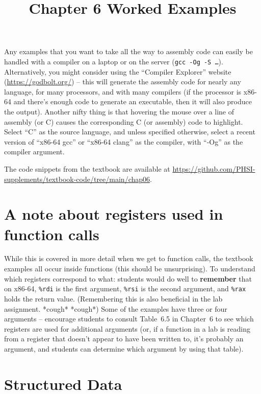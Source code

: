 \documentclass{article}
\begin{document}
\title{Chapter 6 Worked Examples}
\date{}
\maketitle

Any examples that you want to take all the way to assembly code can easily be handled with a compiler on a laptop or on the server (\texttt{gcc -Og -S \dots}).
Alternatively, you might consider using the ``Compiler Explorer'' website (\href{https://godbolt.org/}{https://godbolt.org/}) -- this will generate the assembly code for nearly any language, for many processors, and with many compilers (if the processor is x86-64 and there's enough code to generate an executable, then it will also produce the output).
Another nifty thing is that hovering the mouse over a line of assembly (or C) causes the corresponding C (or assembly) code to highlight.
Select ``C'' as the source language, and unless specified otherwise, select a recent version of ``x86-64 gcc'' or ``x86-64 clang'' as the compiler, with ``-Og'' as the compiler argument.

The code snippets from the textbook are available at \href{https://github.com/PHSI-supplements/textbook-code/tree/main/chap06}{https://github.com/PHSI-supplements/textbook-code/tree/main/chap06}.

\section{A note about registers used in function calls}

While this is covered in more detail when we get to function calls, the textbook examples all occur inside functions (this should be unsurprising).
To understand which registers correspond to what: students would do well to \textbf{remember} that on x86-64, \texttt{\%rdi} is the first argument, \texttt{\%rsi} is the second argument, and \texttt{\%rax} holds the return value.
(Remembering this is also beneficial in the lab assignment. *cough* *cough*)
Some of the examples have three or four arguments -- encourage students to consult Table~6.5 in Chapter~6 to see which registers are used for additional arguments (or, if a function in a lab is reading from a register that doesn't appear to have been written to, it's probably an argument, and students can determine which argument by using that table).

\section{Structured Data}
\end{document}

